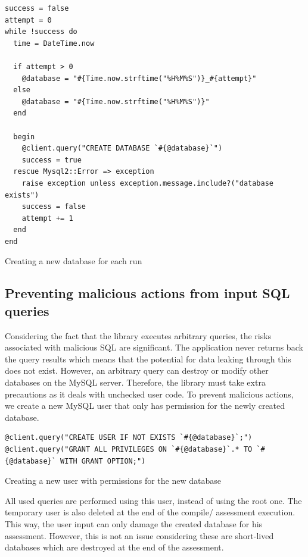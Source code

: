 \begin{listing}
    \centering
    \begin{verbatim}
success = false
attempt = 0
while !success do
  time = DateTime.now

  if attempt > 0
    @database = "#{Time.now.strftime("%H%M%S")}_#{attempt}"
  else
    @database = "#{Time.now.strftime("%H%M%S")}"
  end

  begin
    @client.query("CREATE DATABASE `#{@database}`")
    success = true
  rescue Mysql2::Error => exception
    raise exception unless exception.message.include?("database exists")
    success = false
    attempt += 1
  end
end
\end{verbatim}
    \caption{Creating a new database for each run}
    \label{fig:creating_new_database}
\end{listing}

\subsection{Preventing malicious actions from input SQL queries}

Considering the fact that the library executes arbitrary queries, the risks associated with malicious SQL are significant. The application never returns back the query results which means that the potential for data leaking through this does not exist. However, an arbitrary query can destroy or modify other databases on the MySQL server. Therefore, the library must take extra precautions as it deals with unchecked user code. To prevent malicious actions, we create a new MySQL user that only has permission for the newly created database.
\begin{listing}
\begin{verbatim}
@client.query("CREATE USER IF NOT EXISTS `#{@database}`;")
@client.query("GRANT ALL PRIVILEGES ON `#{@database}`.* TO `#{@database}` WITH GRANT OPTION;")
\end{verbatim}
\caption{Creating a new user with permissions for the new database}
\label{fig:creating_new_user}
\end{listing}
All used queries are performed using this user, instead of using the root one. The temporary user is also deleted at the end of the compile/ assessment execution. This way, the user input can only damage the created database for his assessment. However, this is not an issue considering these are short-lived databases which are destroyed at the end of the assessment.

